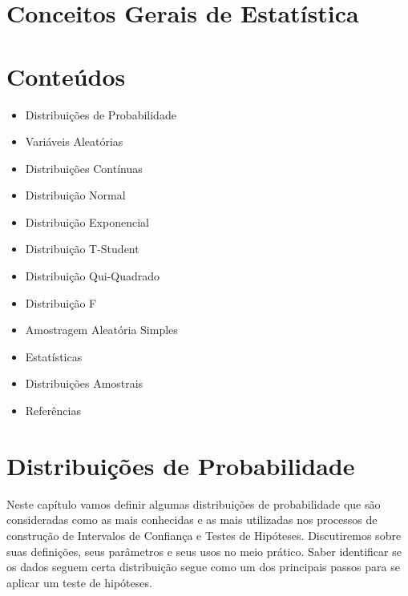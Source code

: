 \documentclass[
  letterpaper,
  DIV=11,
  numbers=noendperiod]{scrreprt}
\providecommand{\tightlist}{%
  \setlength{\itemsep}{0pt}\setlength{\parskip}{0pt}}\usepackage{longtable,booktabs,array}
\begin{document}

\hypertarget{conceitos-gerais-de-estatuxedstica}{%
\chapter{Conceitos Gerais de
Estatística}\label{conceitos-gerais-de-estatuxedstica}}


\hypertarget{conteuxfados-2}{%
\chapter{Conteúdos}\label{conteuxfados-2}}

\begin{itemize}
\tightlist
\item
  Distribuições de Probabilidade
\item
  Variáveis Aleatórias
\item
  Distribuições Contínuas
\item
  Distribuição Normal
\item
  Distribuição Exponencial
\item
  Distribuição T-Student
\item
  Distribuição Qui-Quadrado
\item
  Distribuição F
\item
  Amostragem Aleatória Simples
\item
  Estatísticas
\item
  Distribuições Amostrais
\item
  Referências
\end{itemize}


\hypertarget{distribuiuxe7uxf5es-de-probabilidade}{%
\chapter{Distribuições de
Probabilidade}\label{distribuiuxe7uxf5es-de-probabilidade}}

Neste capítulo vamos definir algumas distribuições de probabilidade que
são consideradas como as mais conhecidas e as mais utilizadas nos
processos de construção de Intervalos de Confiança e Testes de
Hipóteses. Discutiremos sobre suas definições, seus parâmetros e seus
usos no meio prático. Saber identificar se os dados seguem certa
distribuição segue como um dos principais passos para se aplicar um
teste de hipóteses.
\end{document}
